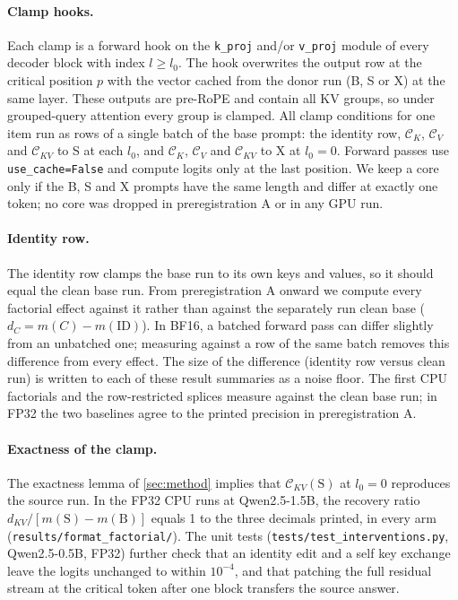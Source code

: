 \paragraph{Clamp hooks.} Each clamp is a forward hook on the \texttt{k\_proj} and/or \texttt{v\_proj} module of every decoder block with index $l \geq l_0$. The hook overwrites the output row at the critical position $p$ with the vector cached from the donor run (B, S or X) at the same layer. These outputs are pre-RoPE and contain all KV groups, so under grouped-query attention every group is clamped. All clamp conditions for one item run as rows of a single batch of the base prompt: the identity row, $\mathcal{C}_K$, $\mathcal{C}_V$ and $\mathcal{C}_{KV}$ to S at each $l_0$, and $\mathcal{C}_K$, $\mathcal{C}_V$ and $\mathcal{C}_{KV}$ to X at $l_0 = 0$. Forward passes use \texttt{use\_cache=False} and compute logits only at the last position. We keep a core only if the B, S and X prompts have the same length and differ at exactly one token; no core was dropped in preregistration A or in any GPU run.

\paragraph{Identity row.} The identity row clamps the base run to its own keys and values, so it should equal the clean base run. From preregistration A onward we compute every factorial effect against it rather than against the separately run clean base ($d_C = m(C) - m(\mathrm{ID})$). In BF16, a batched forward pass can differ slightly from an unbatched one; measuring against a row of the same batch removes this difference from every effect. The size of the difference (identity row versus clean run) is written to each of these result summaries as a noise floor. The first CPU factorials and the row-restricted splices measure against the clean base run; in FP32 the two baselines agree to the printed precision in preregistration A.

\paragraph{Exactness of the clamp.} The exactness lemma of \cref{sec:method} implies that $\mathcal{C}_{KV}(\mathrm{S})$ at $l_0 = 0$ reproduces the source run. In the FP32 CPU runs at Qwen2.5-1.5B, the recovery ratio $d_{KV}/[m(\mathrm{S}) - m(\mathrm{B})]$ equals 1 to the three decimals printed, in every arm (\texttt{results/format\_factorial/}). The unit tests (\texttt{tests/test\_interventions.py}, Qwen2.5-0.5B, FP32) further check that an identity edit and a self key exchange leave the logits unchanged to within $10^{-4}$, and that patching the full residual stream at the critical token after one block transfers the source answer.

